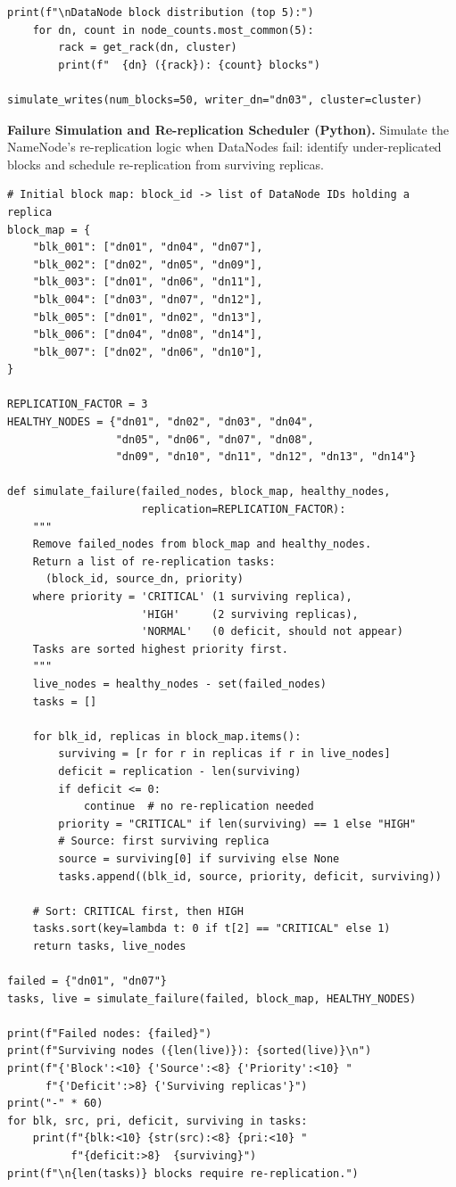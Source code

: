 \begin{lstlisting}[style=pyspark, caption={PE3.2: Rack-aware placement simulator}]
    print(f"\nDataNode block distribution (top 5):")
    for dn, count in node_counts.most_common(5):
        rack = get_rack(dn, cluster)
        print(f"  {dn} ({rack}): {count} blocks")

simulate_writes(num_blocks=50, writer_dn="dn03", cluster=cluster)
\end{lstlisting}

\pe \textbf{Failure Simulation and Re-replication Scheduler (Python).}
Simulate the NameNode's re-replication logic when DataNodes fail:
identify under-replicated blocks and schedule re-replication from
surviving replicas.

\begin{lstlisting}[style=pyspark, caption={PE3.3: Re-replication scheduler}]
# Initial block map: block_id -> list of DataNode IDs holding a replica
block_map = {
    "blk_001": ["dn01", "dn04", "dn07"],
    "blk_002": ["dn02", "dn05", "dn09"],
    "blk_003": ["dn01", "dn06", "dn11"],
    "blk_004": ["dn03", "dn07", "dn12"],
    "blk_005": ["dn01", "dn02", "dn13"],
    "blk_006": ["dn04", "dn08", "dn14"],
    "blk_007": ["dn02", "dn06", "dn10"],
}

REPLICATION_FACTOR = 3
HEALTHY_NODES = {"dn01", "dn02", "dn03", "dn04",
                 "dn05", "dn06", "dn07", "dn08",
                 "dn09", "dn10", "dn11", "dn12", "dn13", "dn14"}

def simulate_failure(failed_nodes, block_map, healthy_nodes,
                     replication=REPLICATION_FACTOR):
    """
    Remove failed_nodes from block_map and healthy_nodes.
    Return a list of re-replication tasks:
      (block_id, source_dn, priority)
    where priority = 'CRITICAL' (1 surviving replica),
                     'HIGH'     (2 surviving replicas),
                     'NORMAL'   (0 deficit, should not appear)
    Tasks are sorted highest priority first.
    """
    live_nodes = healthy_nodes - set(failed_nodes)
    tasks = []

    for blk_id, replicas in block_map.items():
        surviving = [r for r in replicas if r in live_nodes]
        deficit = replication - len(surviving)
        if deficit <= 0:
            continue  # no re-replication needed
        priority = "CRITICAL" if len(surviving) == 1 else "HIGH"
        # Source: first surviving replica
        source = surviving[0] if surviving else None
        tasks.append((blk_id, source, priority, deficit, surviving))

    # Sort: CRITICAL first, then HIGH
    tasks.sort(key=lambda t: 0 if t[2] == "CRITICAL" else 1)
    return tasks, live_nodes

failed = {"dn01", "dn07"}
tasks, live = simulate_failure(failed, block_map, HEALTHY_NODES)

print(f"Failed nodes: {failed}")
print(f"Surviving nodes ({len(live)}): {sorted(live)}\n")
print(f"{'Block':<10} {'Source':<8} {'Priority':<10} "
      f"{'Deficit':>8} {'Surviving replicas'}")
print("-" * 60)
for blk, src, pri, deficit, surviving in tasks:
    print(f"{blk:<10} {str(src):<8} {pri:<10} "
          f"{deficit:>8}  {surviving}")
print(f"\n{len(tasks)} blocks require re-replication.")
\end{lstlisting}
